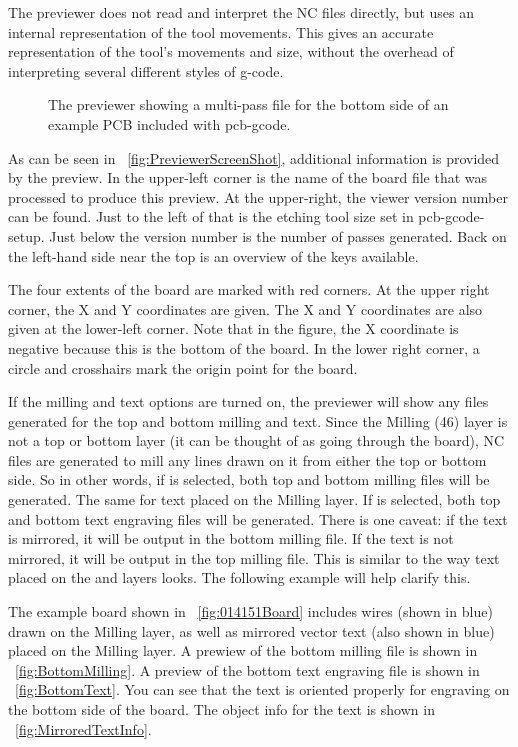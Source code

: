 \documentclass[11pt]{book}
\begin{document}
The previewer does not read and interpret the NC files directly, but uses an internal representation of the tool movements. This gives an accurate representation of the tool's movements and size, without the overhead of interpreting several different styles of g-code.

\begin{figure}
	\caption{The previewer showing a multi-pass file for the bottom side of an example PCB included with pcb-gcode.}
	\label{fig:PreviewerScreenShot}
\end{figure}

As can be seen in \figurename~\vref{fig:PreviewerScreenShot}, additional information is provided by the preview. In the upper-left corner is the name of the board file that was processed to produce this preview. At the upper-right, the viewer version number can be found. Just to the left of that is the etching tool size set in pcb-gcode-setup. Just below the version number is the number of passes generated. Back on the left-hand side near the top is an overview of the keys available.

The four extents of the board are marked with red corners. At the upper right corner, the X and Y coordinates are given. The X and Y coordinates are also given at the lower-left corner. Note that in the figure, the X coordinate is negative because this is the bottom of the board. In the lower right corner, a circle and crosshairs mark the origin point for the board.

If the milling and text options are turned on, the previewer will show any files generated for the top and bottom milling and text. Since the Milling (46) layer is not a top or bottom layer (it can be thought of as going through the board), NC files are generated to mill any lines drawn on it from either the top or bottom side. So in other words, if  is selected, both top and bottom milling files will be generated. The same for text placed on the Milling layer. If  is selected, both top and bottom text engraving files will be generated. There is one caveat: if the text is mirrored, it will be output in the bottom milling file. If the text is not mirrored, it will be output in the top milling file. This is similar to the way text placed on the  and  layers looks. The following example will help clarify this.

The example board  shown in \figurename~\vref{fig:014151Board} includes wires (shown in blue) drawn on the Milling layer, as well as mirrored vector text (also shown in blue) placed on the Milling layer. A prewiew of the bottom milling file is shown in \figurename~\vref{fig:BottomMilling}. A preview of the bottom text engraving file is shown in \figurename~\vref{fig:BottomText}. You can see that the text is oriented properly for engraving on the bottom side of the board. The object info for the text is shown in \figurename~\vref{fig:MirroredTextInfo}.
\end{document}
